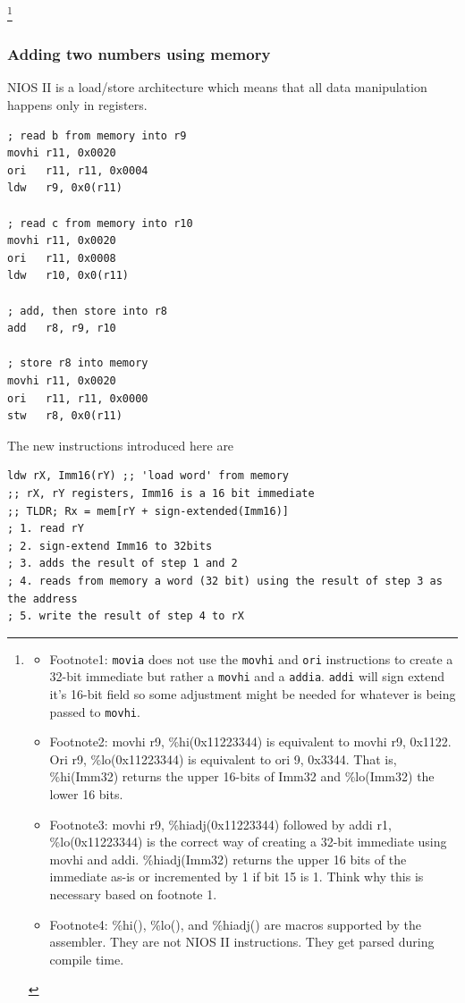 \documentclass[10pt]{article}
\begin{document}
{\let\thefootnote\relax\footnote{
	\begin{itemize}
		\item Footnote1: \texttt{movia} does not use the \texttt{movhi} and \texttt{ori} instructions to create a 32-bit immediate but rather a \texttt{movhi} and a \texttt{addia}.
\texttt{addi}  will sign extend it's 16-bit field so some adjustment might be needed for whatever is being passed to \texttt{movhi}.
		\item Footnote2: movhi r9, \%hi(0x11223344) is equivalent to movhi r9, 0x1122. Ori r9, \%lo(0x11223344) is equivalent to ori 9, 0x3344. That is, \%hi(Imm32) returns the upper 16-bits of Imm32 and \%lo(Imm32) the lower 16 bits.
		\item Footnote3: movhi r9, \%hiadj(0x11223344) followed by addi r1, \%lo(0x11223344) is the correct way of creating a 32-bit immediate using movhi and addi. \%hiadj(Imm32) returns the upper 16 bits of the immediate  as-is or incremented by 1 if bit 15 is 1. Think why this is necessary based on footnote 1.
		\item Footnote4: \%hi(), \%lo(), and \%hiadj() are macros supported by the assembler. They are not NIOS II instructions. They get parsed during compile time. 
	\end{itemize}
}}


\subsubsection{Adding two numbers using memory}

NIOS II is a load/store architecture which means that all data manipulation happens only in registers.


\begin{listing}[H]
\begin{verbatim}
; read b from memory into r9
movhi r11, 0x0020
ori   r11, r11, 0x0004
ldw   r9, 0x0(r11)

; read c from memory into r10
movhi r11, 0x0020
ori   r11, 0x0008
ldw   r10, 0x0(r11)

; add, then store into r8
add   r8, r9, r10

; store r8 into memory
movhi r11, 0x0020
ori   r11, r11, 0x0000
stw   r8, 0x0(r11)
\end{verbatim}
\end{listing}


The new instructions introduced here are


\begin{listing}[H]
\begin{verbatim}
ldw rX, Imm16(rY) ;; 'load word' from memory
;; rX, rY registers, Imm16 is a 16 bit immediate
;; TLDR; Rx = mem[rY + sign-extended(Imm16)]
; 1. read rY
; 2. sign-extend Imm16 to 32bits
; 3. adds the result of step 1 and 2
; 4. reads from memory a word (32 bit) using the result of step 3 as the address
; 5. write the result of step 4 to rX
\end{verbatim}
\end{listing}
\end{document}
